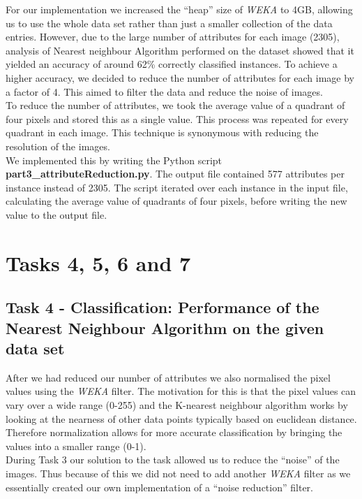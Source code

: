 \documentclass[12pt]{article}
\begin{document}
For our implementation we increased the “heap” size of \textit{WEKA} to 4GB, allowing us to use the whole data set rather than just a smaller collection of the data entries. However, due to the large number of attributes for each image (2305), analysis of Nearest neighbour Algorithm performed on the dataset showed that it yielded an accuracy of around 62\% correctly classified instances. To achieve a higher accuracy, we decided to reduce the number of attributes for each image by a factor of 4. This aimed to filter the data and reduce the noise of images.\\

To reduce the number of attributes, we took the average value of a quadrant of four pixels and stored this as a single value. This process was repeated for every quadrant in each image. This technique is synonymous with reducing the resolution of the images.\\

We implemented this by writing the Python script \textbf{part3_attributeReduction.py}. The output file contained 577 attributes per instance instead of 2305. The script iterated over each instance in the input file, calculating the average value of quadrants of four pixels, before writing the new value to the output file.\\


\section{Tasks 4, 5, 6 and 7}

\subsection{Task 4 - Classification: Performance of the Nearest Neighbour Algorithm on the given data set}

After we had reduced our number of attributes we also normalised the pixel values using the \textit{WEKA} filter. The motivation for this is that the pixel values can vary over a wide range (0-255) and the K-nearest neighbour algorithm works by looking at the nearness of other data points typically based on euclidean distance. Therefore normalization allows for more accurate classification by bringing the values into a smaller range (0-1).\\

During Task 3 our solution to the task allowed us to reduce the “noise” of the images. Thus because of this we did not need to add another \textit{WEKA} filter as we essentially created our own implementation of a “noise reduction” filter.\\ 
\end{document}
